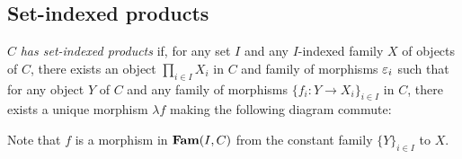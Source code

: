 \subsection{Set-indexed products}

$C$ \emph{has set-indexed products} if, for any set $I$ and any $I$-indexed family $X$ of objects of $C$,
there exists an object $\prod_{i \in I}X_i$ in $C$ and family of morphisms $\varepsilon_i$ such that for any object
$Y$ of $C$ and any family of morphisms $\{f_i: Y \to X_i\}_{i \in I}$ in $C$, there exists a unique morphism
$\lambda f$ making the following diagram commute:

\begin{center}
\end{center}

Note that $f$ is a morphism in $\mathbf{Fam}(I,C)$ from the constant family $\{Y\}_{i \in I}$ to $X$.
